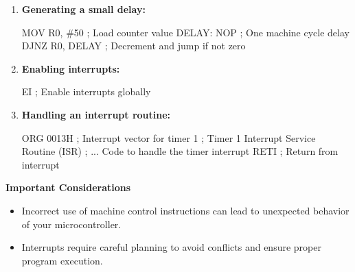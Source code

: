 \documentclass[
]{article}
\newenvironment{Shaded}{}{}
\newcommand{\NormalTok}[1]{#1}
\begin{document}
\begin{enumerate}
\def\labelenumi{\arabic{enumi}.}
\item
  \textbf{Generating a small delay:}

\begin{Shaded}
\begin{Highlighting}[]
\NormalTok{MOV R0, \#50   ; Load counter value}
\NormalTok{DELAY: NOP    ; One machine cycle delay}
\NormalTok{       DJNZ R0, DELAY ; Decrement and jump if not zero}
\end{Highlighting}
\end{Shaded}
\item
  \textbf{Enabling interrupts:}

\begin{Shaded}
\begin{Highlighting}[]
\NormalTok{EI   ; Enable interrupts globally}
\end{Highlighting}
\end{Shaded}
\item
  \textbf{Handling an interrupt routine:}

\begin{Shaded}
\begin{Highlighting}[]
\NormalTok{ORG 0013H  ; Interrupt vector for timer 1}
\NormalTok{; Timer 1 Interrupt Service Routine (ISR)}
\NormalTok{; ... Code to handle the timer interrupt}
\NormalTok{RETI       ; Return from interrupt}
\end{Highlighting}
\end{Shaded}
\end{enumerate}

\textbf{Important Considerations}

\begin{itemize}
\item
  Incorrect use of machine control instructions can lead to unexpected
  behavior of your microcontroller.
\item
  Interrupts require careful planning to avoid conflicts and ensure
  proper program execution.
\end{itemize}
\end{document}
